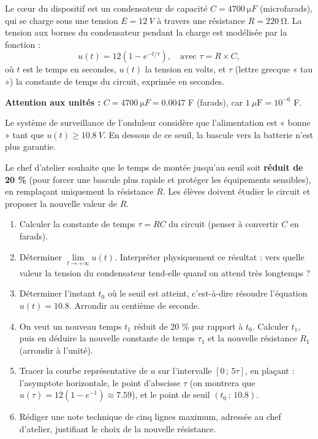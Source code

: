 \documentclass[11pt]{article}
\newcommand{\cle}[1]{{\popxbold\color{popdark}#1}}
\newcounter{popsec}
\newcounter{popsub}
\newcommand{\courssub}[1]{%
  \stepcounter{popsub}%
  \par\vspace{9pt}\noindent{\popxbold\fontsize{11.5}{13}\selectfont\color{popink}{\color{poporange}\thepopsec.\thepopsub}\hspace{6pt}#1}\par\nopagebreak\vspace{4pt}
}
\begin{document}
Le cœur du dispositif est un \cle{condensateur} de capacité $C = \SI{4700}{\micro F}$ (microfarads), qui se charge sous une tension $E = \SI{12}{V}$ à travers une résistance $R = \SI{220}{\ohm}$. La tension aux bornes du condensateur pendant la charge est modélisée par la fonction :
\[ u(t) = 12\left(1 - e^{-t/\tau}\right), \quad \text{avec } \tau = R \times C, \]
où $t$ est le temps en secondes, $u(t)$ la tension en volts, et $\tau$ (lettre grecque « tau ») la \cle{constante de temps} du circuit, exprimée en secondes.

\textbf{Attention aux unités :} $C = \SI{4700}{\micro F} = \num{0,0047}$ F (farads), car $1\ \mu\text{F} = 10^{-6}$ F.

Le système de surveillance de l'onduleur considère que l'alimentation est « bonne » tant que $u(t) \geq \SI{10,8}{V}$. En dessous de ce seuil, la bascule vers la batterie n'est plus garantie.

Le chef d'atelier souhaite que le temps de montée jusqu'au seuil soit \textbf{réduit de 20 \%} (pour forcer une bascule plus rapide et protéger les équipements sensibles), en remplaçant uniquement la résistance $R$. Les élèves doivent étudier le circuit et proposer la nouvelle valeur de $R$.

\courssub{Consignes}

\begin{enumerate}
\item Calculer la constante de temps $\tau = RC$ du circuit (penser à convertir $C$ en farads).
\item Déterminer $\lim\limits_{t \to +\infty} u(t)$. Interpréter physiquement ce résultat : vers quelle valeur la tension du condensateur tend-elle quand on attend très longtemps ?
\item Déterminer l'instant $t_0$ où le seuil est atteint, c'est-à-dire résoudre l'équation $u(t) = \num{10,8}$. Arrondir au centième de seconde.
\item On veut un nouveau temps $t_1$ réduit de 20 \% par rapport à $t_0$. Calculer $t_1$, puis en déduire la nouvelle constante de temps $\tau_1$ et la nouvelle résistance $R_1$ (arrondir à l'unité).
\item Tracer la courbe représentative de $u$ sur l'intervalle $[0\,;\,5\tau]$, en plaçant : l'asymptote horizontale, le point d'abscisse $\tau$ (on montrera que $u(\tau) = 12(1 - e^{-1}) \approx \num{7,59}$), et le point de seuil $(t_0\,;\,\num{10,8})$.
\item Rédiger une note technique de cinq lignes maximum, adressée au chef d'atelier, justifiant le choix de la nouvelle résistance.
\end{enumerate}
\end{document}

